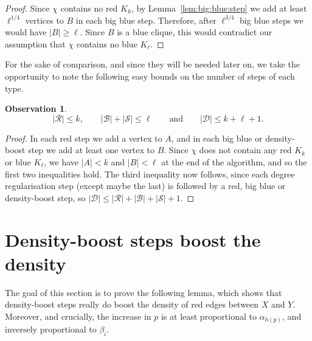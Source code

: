 \documentclass[12pt,reqno]{amsart}
\newtheorem{obs}[theorem]{Observation}
\theoremstyle{definition}
\theoremstyle{remark}
\newcommand\cB{\mathcal{B}}
\def\cS{\mathcal{S}}
\renewcommand{\le}{\leqslant}
\renewcommand{\ge}{\geqslant}
\def\cD{\mathcal{D}}
\def\cR{\mathcal{R}}
\def\cB{\mathcal{B}}
\begin{document}
\begin{proof}
Since $\chi$ contains no red $K_k$, by Lemma~\ref{lem:big:blue:step} we add at least $\ell^{1/4}$ vertices to $B$ in each big blue step. Therefore, after $\ell^{3/4}$ big blue steps we would have $|B| \ge \ell$. Since $B$ is a blue clique, this would contradict our assumption that $\chi$ contains no blue $K_\ell$. 
\end{proof}

For the sake of comparison, and since they will be needed later on, we take the opportunity to note the following easy bounds on the number of steps of each type. 


\begin{obs}\label{obs:RBSD:sizes}
$$|\cR| \le k, \qquad |\cB| + |\cS| \le \ell \qquad \text{and} \qquad |\cD| \le k + \ell + 1.$$
\end{obs}

\begin{proof}
In each red step we add a vertex to $A$, and in each big blue or density-boost step we add at least one vertex to $B$. Since $\chi$ does not contain any red $K_k$ or blue $K_\ell$, we have $|A| < k$ and $|B| < \ell$ at the end of the algorithm, and so the first two inequalities hold. The third inequality now follows, since each degree regularisation step (except maybe the last) is followed by a red, big blue or density-boost step, so $|\cD| \le |\cR| + |\cB| + |\cS| + 1$. 
\end{proof}


\section{Density-boost steps boost the density}\label{density:sec}

The goal of this section is to prove the following lemma, which shows that density-boost steps really do boost the density of red edges between $X$ and $Y$. Moreover, and crucially, the increase in $p$ is at least proportional to $\alpha_{h(p)}$, and inversely proportional to $\beta_i$. 
\end{document}
